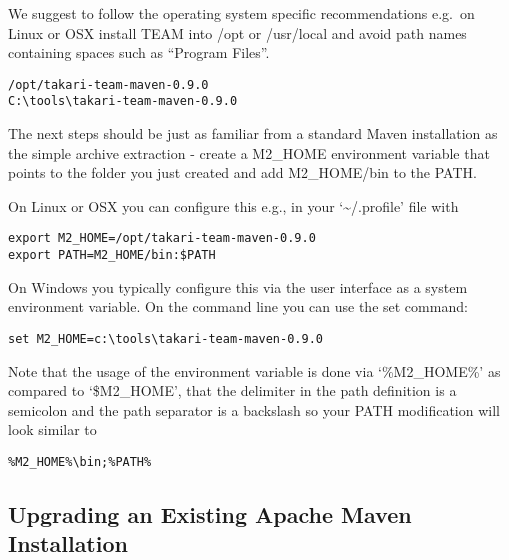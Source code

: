 \documentclass[a4paper]{book}
\begin{document}
We suggest to follow the operating system specific recommendations e.g.~on Linux or OSX install TEAM into /opt or /usr/local and avoid path names containing spaces such as “Program Files”.

\begin{shaded}\begin{verbatim}
/opt/takari-team-maven-0.9.0
C:\tools\takari-team-maven-0.9.0
\end{verbatim}\end{shaded}

The next steps should be just as familiar from a standard Maven installation as the simple archive extraction - create a M2\_HOME environment variable that points to the folder you just created and add M2\_HOME/bin to the PATH.

On Linux or OSX you can configure this e.g., in your `\textasciitilde{}/.profile' file with

\begin{shaded}\begin{verbatim}
export M2_HOME=/opt/takari-team-maven-0.9.0
export PATH=M2_HOME/bin:$PATH
\end{verbatim}\end{shaded}

On Windows you typically configure this via the user interface as a system environment variable. On the command line you can use the set command:

\begin{shaded}\begin{verbatim}
set M2_HOME=c:\tools\takari-team-maven-0.9.0
\end{verbatim}\end{shaded}

Note that the usage of the environment variable is done via `\%M2\_HOME\%' as compared to `\$M2\_HOME', that the delimiter in the path definition is a semicolon and the path separator is a backslash so your PATH modification will look similar to

\begin{shaded}\begin{verbatim}
%M2_HOME%\bin;%PATH%
\end{verbatim}\end{shaded}

\subsection{Upgrading an Existing Apache Maven Installation}\label{upgrading-an-existing-apache-maven-installation}
\end{document}

